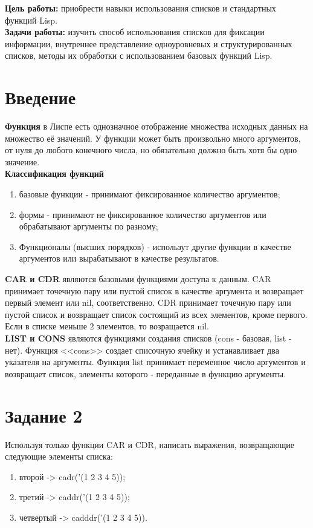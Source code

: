 \documentclass[a4paper, 12pt]{article}
\begin{document}
\tableofcontents
\clearpage
\newpage

\textbf{Цель работы:} приобрести навыки использования списков и стандартных функций Lisp.
\\ \hspace*{5mm} \textbf{Задачи работы:} изучить способ использования списков для фиксации информации, внутреннее представление одноуровневых и структурированных списков, методы их обработки с использованием базовых функций Lisp.


\section*{Введение}

\hspace*{5mm} \textbf{Функция} в Лиспе есть однозначное отображение множества исходных данных на множество её значений. У функции может быть произвольно много аргументов, от нуля до любого конечного числа, но обязательно должно быть хотя бы одно значение.
\\ \textbf{Классификация функций}
\begin{enumerate}
	\item базовые функции - принимают фиксированное количество аргументов;
	\item формы - принимают не фиксированное количество аргументов или обрабатывают аргументы по разному;
	\item Функционалы (высших порядков) - использут другие функции в качестве аргументов или вырабатывают в качестве результатов. 
\end{enumerate}
 \hspace*{5mm} \textbf{CAR и CDR} являются базовыми функциями доступа к данным. CAR принимает точечную пару или пустой список в качестве аргумента и возвращает первый элемент или nil, соответственно. CDR принимает точечную пару или пустой список и возвращает список состоящий из всех элементов, кроме первого. Если в списке меньше 2 элементов, то возращается nil.
 \\ \hspace*{5mm} \textbf{LIST и CONS} являются функциями создания списков (cons - базовая, list - нет). Функция <<cons>> создает списочную ячейку и устанавливает два указателя на аргументы. Функция list принимает переменное число аргументов и возвращает список, элементы которого  - переданные в функцию аргументы.

\section*{Задание 2}
Используя только функции CAR и CDR, написать выражения, возвращающие следующие элементы списка:
\begin{enumerate}
	\item второй -> cadr('(1 2 3 4 5));
	\item третий -> caddr('(1 2 3 4 5));
	\item четвертый -> cadddr('(1 2 3 4 5)).
\end{enumerate}
\end{document}
